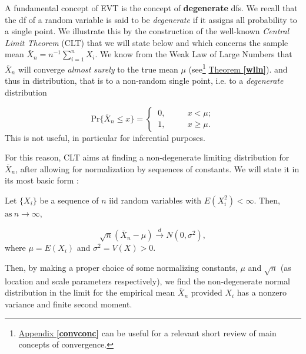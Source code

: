 A fundamental concept of EVT is the concept of \textbf{degenerate} dfs. We recall that the df of a random variable is said to be \emph{degenerate} if it assigns all probability to a single point.
We illustrate this by the construction of the well-known \emph{Central Limit Theorem} (CLT) that we will state below and which concerns the sample mean $\bar{X}_n=n^{-1}\sum_{i=1}^nX_i$. We know from the Weak Law of Large Numbers that  $\bar{X}_n$ will converge \emph{almost surely} to the true mean $\mu$ (see\footnote{\hyperref[convconc]{Appendix \textbf{\ref{convconc}}} can be useful for a relevant short review of main concepts of convergence.} \hyperref[wlln]{Theorem \textbf{\ref{wlln}}}). and thus in distribution, that is to a non-random single point, i.e. to a \emph{degenerate} distribution 

\begin{equation*}
\text{Pr}\big\{\bar{X}_n\leq x\big\}= \begin{cases}
\ 0, \ \ \ \ \ \ \ \ \ \ \ \ x<\mu; \\
\ 1, \ \ \ \  \ \ \ \ \ \ \ \ x\geq \mu. 
\end{cases}
\end{equation*}
This is not useful, in particular for inferential purposes. 

For this reason, CLT aims at finding a non-degenerate limiting distribution for $\bar{X}_n$, after allowing for normalization by sequences of constants. We will state it in its most basic form :

\begin{exe} 
	Let $\{X_i\}$ be a sequence of $n$ iid random variables with $E(X^2_i)<\infty$. Then, $\text{as} \ n\rightarrow\infty$,
	
	\begin{equation*}
	\sqrt{n}(\bar{X}_n-\mu)\stackrel{d}{\longrightarrow}N(0,\sigma^2),
	\end{equation*}
	where $\mu=E(X_i)$ and $\sigma^2=V(X)>0$.
\end{exe}

Then, by making a proper choice of some normalizing constants, $\mu$ and $\sqrt{n}$ (as location and scale parameters respectively), we find the non-degenerate normal distribution in the limit for the empirical mean $\bar{X}_n$ provided $X_i$ has a nonzero variance and finite second moment. 

